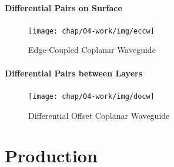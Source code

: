  \paragraph{Differential Pairs on Surface}
\begin{figure}[!htbp]
	\centering
	\texttt{[image: chap/04-work/img/eccw]}
	\caption{Edge-Coupled Coplanar Waveguide}
	\label{fig:eccw_geometry}
\end{figure}

\paragraph{Differential Pairs between Layers}
\begin{figure}[!htbp]
	\centering
	\texttt{[image: chap/04-work/img/docw]}
	\caption{Differential Offset Coplanar Waveguide}
	\label{fig:docw}
\end{figure}






\section{Production}
